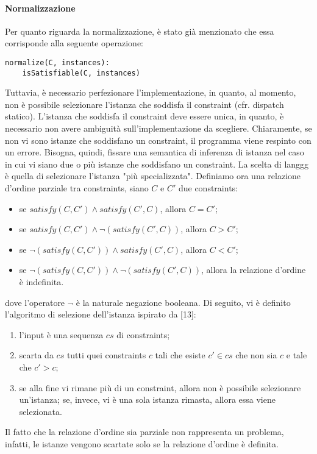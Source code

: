 \documentclass[10pt,a4paper]{article}
\begin{document}
\paragraph{Normalizzazione}
Per quanto riguarda la normalizzazione, è stato già menzionato che essa corrisponde alla seguente operazione:
\begin{lstlisting}
normalize(C, instances):
    isSatisfiable(C, instances)
\end{lstlisting}
Tuttavia, è necessario perfezionare l'implementazione, in quanto, al momento, non è possibile selezionare l'istanza
che soddisfa il constraint (cfr. dispatch statico). L'istanza che soddisfa il constraint deve essere unica,
in quanto, è necessario non avere ambiguità sull'implementazione da scegliere. Chiaramente, se non vi sono istanze
che soddisfano un constraint, il programma viene respinto con un errore. Bisogna, quindi, fissare una semantica
di inferenza di istanza nel caso in cui vi siano due o più istanze che soddisfano un constraint. La scelta di langgg è
quella di selezionare l'istanza "più specializzata". Definiamo ora una relazione d'ordine parziale tra constraints,
siano $ C $ e $ C' $ due constraints:
\begin{itemize}
    \item se $ satisfy(C, C') \wedge satisfy(C', C) $, allora $ C = C' $;
    \item se $ satisfy(C, C') \wedge \neg(satisfy(C', C)) $, allora $ C > C' $;
    \item se $ \neg(satisfy(C, C')) \wedge satisfy(C', C) $, allora $ C < C' $;
    \item se $ \neg(satisfy(C, C')) \wedge \neg(satisfy(C', C)) $, allora la relazione d'ordine è indefinita.
\end{itemize}
dove l'operatore $ \neg $ è la naturale negazione booleana. Di seguito, vi è definito l'algoritmo di selezione dell'istanza
ispirato da [13]:
\begin{enumerate}
    \item l'input è una sequenza $ cs $ di constraints;
    \item scarta da $ cs $ tutti quei constraints $ c $ tali che esiste $ c' \in cs $ che non sia $ c $ e tale che
    $ c' > c $;
    \item se alla fine vi rimane più di un constraint, allora non è possibile selezionare un'istanza; se, invece, vi
    è una sola istanza rimasta, allora essa viene selezionata.
\end{enumerate}
Il fatto che la relazione d'ordine sia parziale non rappresenta un problema, infatti, le istanze vengono scartate solo
se la relazione d'ordine è definita.
\end{document}
